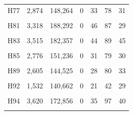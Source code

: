 \documentclass[
  a4paper,
  titlepage]{article}
\begin{document}
\begin{longtable}[t]{lllllll}
H77 & 2,874 & 148,264 & 0 & 33 & 78 & 31\\
 
\cellcolor{gray!6}{H80} & \cellcolor{gray!6}{1,749} & \cellcolor{gray!6}{108,928} & \cellcolor{gray!6}{0} & \cellcolor{gray!6}{14} & \cellcolor{gray!6}{60} & \cellcolor{gray!6}{31}\\
 
H81 & 3,318 & 188,292 & 0 & 46 & 87 & 29\\
 
\cellcolor{gray!6}{H82} & \cellcolor{gray!6}{1,355} & \cellcolor{gray!6}{111,023} & \cellcolor{gray!6}{0} & \cellcolor{gray!6}{20} & \cellcolor{gray!6}{40} & \cellcolor{gray!6}{24}\\
 
H83 & 3,515 & 182,357 & 0 & 44 & 89 & 45\\
 
\cellcolor{gray!6}{H84} & \cellcolor{gray!6}{1,372} & \cellcolor{gray!6}{120,335} & \cellcolor{gray!6}{0} & \cellcolor{gray!6}{21} & \cellcolor{gray!6}{44} & \cellcolor{gray!6}{26}\\
 
H85 & 2,776 & 151,236 & 0 & 31 & 79 & 30\\
 
\cellcolor{gray!6}{H87} & \cellcolor{gray!6}{2,989} & \cellcolor{gray!6}{147,500} & \cellcolor{gray!6}{0} & \cellcolor{gray!6}{39} & \cellcolor{gray!6}{84} & \cellcolor{gray!6}{38}\\
 
H89 & 2,605 & 144,525 & 0 & 28 & 80 & 33\\
 
\cellcolor{gray!6}{H91} & \cellcolor{gray!6}{2,052} & \cellcolor{gray!6}{113,492} & \cellcolor{gray!6}{0} & \cellcolor{gray!6}{27} & \cellcolor{gray!6}{58} & \cellcolor{gray!6}{26}\\
 
H92 & 1,532 & 140,662 & 0 & 21 & 42 & 29\\
 
\cellcolor{gray!6}{H93} & \cellcolor{gray!6}{2,087} & \cellcolor{gray!6}{116,544} & \cellcolor{gray!6}{0} & \cellcolor{gray!6}{24} & \cellcolor{gray!6}{43} & \cellcolor{gray!6}{24}\\
 
H94 & 3,620 & 172,856 & 0 & 35 & 97 & 40\\
 
\cellcolor{gray!6}{H95} & \cellcolor{gray!6}{2,247} & \cellcolor{gray!6}{134,348} & \cellcolor{gray!6}{0} & \cellcolor{gray!6}{24} & \cellcolor{gray!6}{72} & \cellcolor{gray!6}{23}\\
 

\end{longtable}
\end{document}
